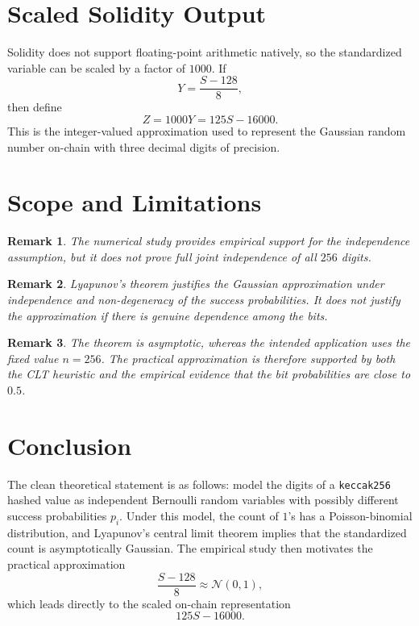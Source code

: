 \documentclass[11pt]{article}
\newtheorem{remark}{Remark}
\begin{document}
\section{Scaled Solidity Output}

Solidity does not support floating-point arithmetic natively, so the
standardized variable can be scaled by a factor of $1000$. If
\[
Y = \frac{S-128}{8},
\]
then define
\[
Z = 1000Y = 125S - 16000.
\]
This is the integer-valued approximation used to represent the Gaussian random
number on-chain with three decimal digits of precision.

\section{Scope and Limitations}

\begin{remark}
The numerical study provides empirical support for the independence assumption,
but it does not prove full joint independence of all $256$ digits.
\end{remark}

\begin{remark}
Lyapunov's theorem justifies the Gaussian approximation under independence and
non-degeneracy of the success probabilities. It does not justify the
approximation if there is genuine dependence among the bits.
\end{remark}

\begin{remark}
The theorem is asymptotic, whereas the intended application uses the fixed value
$n=256$. The practical approximation is therefore supported by both the CLT
heuristic and the empirical evidence that the bit probabilities are close to
$0.5$.
\end{remark}

\section{Conclusion}

The clean theoretical statement is as follows: model the digits of a
\texttt{keccak256} hashed value as independent Bernoulli random variables with
possibly different success probabilities $p_i$. Under this model, the count of
$1$'s has a Poisson-binomial distribution, and Lyapunov's central limit theorem
implies that the standardized count is asymptotically Gaussian. The empirical
study then motivates the practical approximation
\[
\frac{S-128}{8} \approx \mathcal{N}(0,1),
\]
which leads directly to the scaled on-chain representation
\[
125S - 16000.
\]
\end{document}
